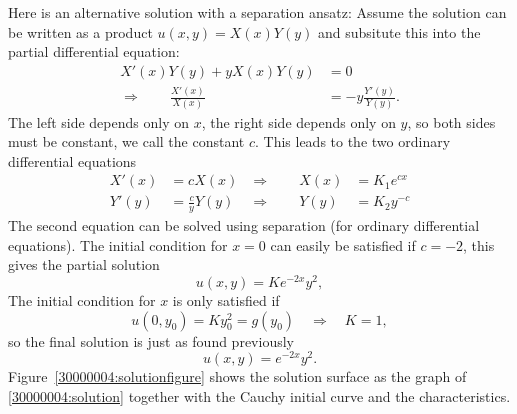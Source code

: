\begin{loesung}
Here is an alternative solution with a separation ansatz:
Assume the solution can be written as a product $u(x,y)=X(x)Y(y)$
and subsitute this into the partial differential equation:
\begin{align*}
X'(x)Y(y)+yX(x)Y(y)&=0\\
\Rightarrow\qquad \frac{X'(x)}{X(x)}&=-y\frac{Y'(y)}{Y(y)}.
\end{align*}
The left side depends only on $x$, the right side depends only on $y$,
so both sides must be constant, we call the constant $c$.
This leads to the two ordinary differential equations
\begin{align*}
X'(x)&=cX(x)&\Rightarrow\qquad X(x)&=K_1e^{cx}\\
Y'(y)&=\frac{c}{y}Y(y)&\Rightarrow\qquad Y(y)&=K_2y^{-c}
\end{align*}
The second equation can be solved using separation (for ordinary
differential equations).
The initial condition for $x=0$ can easily be satisfied if
$c=-2$, this gives the partial solution
\[
u(x,y)=Ke^{-2x}y^2,
\]
The initial condition for $x$ is only satisfied  if
\[
u(0,y_0)=Ky_0^2=g(y_0)\quad\Rightarrow\quad K=1,
\]
so the final solution is just as found previously
\begin{equation}
u(x,y)=e^{-2x}y^2.
\label{30000004:solution}
\end{equation}
Figure~\ref{30000004:solutionfigure} shows the solution surface as the
graph of \eqref{30000004:solution} together 
with the Cauchy initial curve and the characteristics.
\end{loesung}
